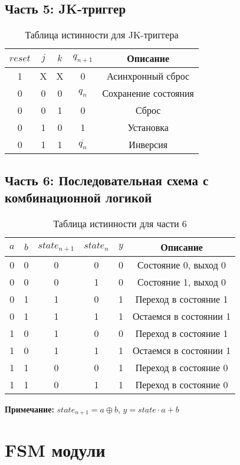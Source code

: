 \documentclass[12pt,a4paper]{article}
\begin{document}
\subsection{Часть 5: JK-триггер}

\begin{table}[h]
\centering
\caption{Таблица истинности для JK-триггера}
\begin{tabular}{|c|c|c|c|c|}
\hline
$reset$ & $j$ & $k$ & $q_{n+1}$ & Описание \\
\hline
1 & X & X & 0 & Асинхронный сброс \\
0 & 0 & 0 & $q_n$ & Сохранение состояния \\
0 & 0 & 1 & 0 & Сброс \\
0 & 1 & 0 & 1 & Установка \\
0 & 1 & 1 & $\overline{q_n}$ & Инверсия \\
\hline
\end{tabular}
\end{table}

\subsection{Часть 6: Последовательная схема с комбинационной логикой}

\begin{table}[h]
\centering
\caption{Таблица истинности для части 6}
\begin{tabular}{|c|c|c|c|c|c|}
\hline
$a$ & $b$ & $state_{n+1}$ & $state_n$ & $y$ & Описание \\
\hline
0 & 0 & 0 & 0 & 0 & Состояние 0, выход 0 \\
0 & 0 & 0 & 1 & 0 & Состояние 1, выход 0 \\
0 & 1 & 1 & 0 & 1 & Переход в состояние 1 \\
0 & 1 & 1 & 1 & 1 & Остаемся в состоянии 1 \\
1 & 0 & 1 & 0 & 0 & Переход в состояние 1 \\
1 & 0 & 1 & 1 & 1 & Остаемся в состоянии 1 \\
1 & 1 & 0 & 0 & 1 & Переход в состояние 0 \\
1 & 1 & 0 & 1 & 1 & Переход в состояние 0 \\
\hline
\end{tabular}
\end{table}

\textbf{Примечание:} $state_{n+1} = a \oplus b$, $y = state \cdot a + b$

\section{FSM модули}
\end{document}
